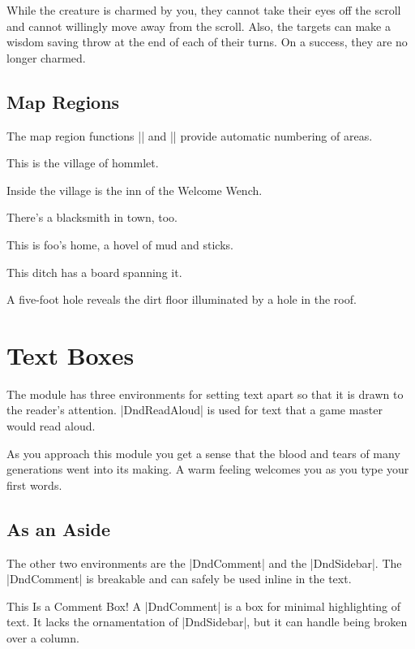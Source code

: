 \documentclass[10pt,twocolumn,twoside,openany,bg=full,layout=true,nomultitoc]{dndbook}
\begin{document}
While the creature is charmed by you, they cannot take their eyes off the scroll and cannot willingly move away from the scroll. Also, the targets can make a wisdom saving throw at the end of each of their turns. On a success, they are no longer charmed.

\section{Map Regions}
The map region functions |\DndArea| and |\DndSubArea| provide automatic numbering of areas.

This is the village of hommlet.

Inside the village is the inn of the Welcome Wench.

There's a blacksmith in town, too.

This is foo's home, a hovel of mud and sticks.

This ditch has a board spanning it.

A five-foot hole reveals the dirt floor illuminated by a hole in the roof.

\chapter{Text Boxes}

The module has three environments for setting text apart so that it is drawn to the reader's attention. |DndReadAloud| is used for text that a game master would read aloud.

\begin{DndReadAloud}
  As you approach this module you get a sense that the blood and tears of many generations went into its making. A warm feeling welcomes you as you type your first words.
\end{DndReadAloud}

\section{As an Aside}
The other two environments are the |DndComment| and the |DndSidebar|. The |DndComment| is breakable and can safely be used inline in the text.

\begin{DndComment}{This Is a Comment Box!}
  A |DndComment| is a box for minimal highlighting of text. It lacks the ornamentation of |DndSidebar|, but it can handle being broken over a column.
\end{DndComment}
\end{document}
